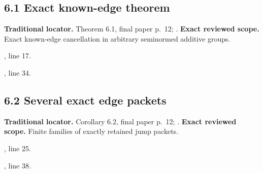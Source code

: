 \subsection{6.1 Exact known-edge theorem}
\label{result:6.1}
\textbf{Traditional locator.} Theorem 6.1, final paper p.~12; .
\textbf{Exact reviewed scope.} Exact known-edge cancellation in arbitrary seminormed additive groups.
{\small{}\par}
{\footnotesize\color{muted}, line 17.\par}\smallskip
{\small{}\par}
{\footnotesize\color{muted}, line 34.\par}\smallskip
{}
\subsection{6.2 Several exact edge packets}
\label{result:6.2}
\textbf{Traditional locator.} Corollary 6.2, final paper p.~12; .
\textbf{Exact reviewed scope.} Finite families of exactly retained jump packets.
{\small{}\par}
{\footnotesize\color{muted}, line 25.\par}\smallskip
{\small{}\par}
{\footnotesize\color{muted}, line 38.\par}\smallskip
{}
